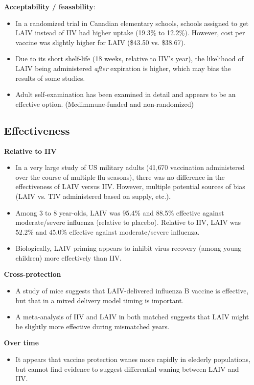\documentclass[11pt]{article}
\begin{document}
\begin{multicols}{2}
\textbf{Acceptability / feasability}:
\begin{itemize}
\item In a randomized trial in Canadian elementary schools, schools assigned to get LAIV instead of IIV had higher uptake (19.3\% to 12.2\%). However, cost per vaccine was slightly higher for LAIV (\$43.50 vs. \$38.67). \cite{Kwong2015}
\item Due to its short shelf-life (18 weeks, relative to IIV's year), the likelihood of LAIV being administered \emph{after} expiration is higher, which may bias the results of some studies. \cite{cdc2014}  
\item Adult self-examination has been examined in detail and appears to be an effective option. \cite{Ambrose2013} (Medimmune-funded and non-randomized)
\end{itemize}

\subsection*{Effectiveness}

\textbf{Relative to IIV}
\begin{itemize}
\item In a very large study of US military adults (41,670 vaccination administered over the course of multiple flu seasons), there was no difference in the effectiveness of LAIV versus IIV. However, multiple potential sources of bias (LAIV vs. TIV administered based on supply, etc.). \cite{Phillips2012} 
\item Among 3 to 8 year-olds, LAIV was 95.4\% and 88.5\% effective against moderate/severe influenza (relative to placebo).  Relative to IIV, LAIV was 52.2\% and 45.0\% effective against moderate/severe influenza. \cite{Ambrose2014}
\item Biologically, LAIV priming appears to inhibit virus recovery (among young children) more effectively than IIV. \cite{Ilyushina2014}
\end{itemize}

\newpage
\textbf{Cross-protection}
\begin{itemize}
\item A study of mice suggests that LAIV-delivered influenza B vaccine is effective, but that in a mixed delivery model timing is important. \cite{Huber2008}
\item A meta-analysis of IIV and LAIV in both matched suggests that LAIV might be slightly more effective during mismatched years. \cite{Tricco2013}
\end{itemize}

\textbf{Over time}
\begin{itemize}
\item It appears that vaccine protection wanes more rapidly in elederly populations, but cannot find evidence to suggest differential waning between LAIV and IIV. \cite{cdcrec2014}  
\end{itemize}




\end{multicols}
\end{document}
